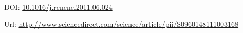 \documentclass[a4paper,12pt]{article}
\newcommand{\doi}[1]{DOI: \href{https://doi.org/#1}{#1}}
\begin{document}
\thispagestyle{empty}

\vspace{3cm}

\nocite{FDB-art-20}
\printbibliography

\vspace{3cm}
\doi{10.1016/j.renene.2011.06.024}

\vspace{1.5cm}
Url: \url{http://www.sciencedirect.com/science/article/pii/S0960148111003168}

\newpage

\end{document}
